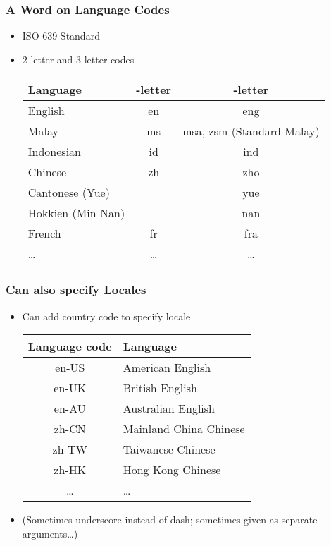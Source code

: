 \begin{frame}
\frametitle{A Word on Language Codes}
    
\begin{itemize}
    \item ISO-639 Standard
    \item 2-letter and 3-letter codes

\bigskip
\begin{center}
\begin{tabular}{l >{\ttfamily}c >{\ttfamily}c}
\toprule
Language & 2-letter & 3-letter\\
\midrule
English & en & eng\\
Malay & ms & msa, zsm \textsf{(Standard Malay)}\\
Indonesian & id & ind\\
Chinese & zh & zho \\
Cantonese (Yue) & & yue\\
Hokkien (Min Nan) & & nan\\
French & fr & fra\\
\ldots & \ldots & \ldots\\
\bottomrule
\end{tabular}
\end{center}
\bigskip
\end{itemize}
\end{frame}

\begin{frame}
\frametitle{Can also specify Locales}
    
\begin{itemize}
    \item Can add country code to specify locale

\begin{center}
\begin{tabular}{>{\ttfamily}c l}
\toprule
Language code & Language \\
\midrule
en-US & American English\\
en-UK & British English\\
en-AU & Australian English\\
zh-CN & Mainland China Chinese\\
zh-TW & Taiwanese Chinese\\
zh-HK & Hong Kong Chinese\\
\ldots & \ldots\\
\bottomrule
\end{tabular}
\end{center}

\item (Sometimes underscore instead of dash; sometimes given as separate arguments\ldots)

\end{itemize}
\end{frame}

